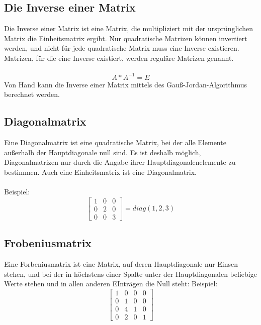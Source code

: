 \documentclass[11pt]{scrreprt}
\begin{document}
\subsection{Die Inverse einer Matrix}
Die Inverse einer Matrix ist eine Matrix, die multipliziert mit der ursprünglichen Matrix die Einheitsmatrix ergibt. Nur quadratische Matrizen können invertiert werden, und nicht für jede quadratische Matrix muss eine Inverse existieren. Matrizen, für die eine Inverse existiert, werden reguläre Matrizen genannt.\\
\\
\begin{equation}
A * A^{-1} = E
\end{equation}
Von Hand kann die Inverse einer Matrix mittels des Gauß-Jordan-Algorithmus berechnet werden.
\subsection{Diagonalmatrix}
Eine Diagonalmatrix ist eine quadratische Matrix, bei der alle Elemente außerhalb der Hauptdiagonale null sind. Es ist deshalb möglich, Diagonalmatrizen nur durch die Angabe ihrer Hauptdiagonalenelemente zu bestimmen. Auch eine Einheitsmatrix ist eine Diagonalmatrix.\\
\\
Beispiel:
\begin{equation}
\begin{bmatrix}
1 & 0 & 0 \\
0 & 2 & 0 \\
0 & 0 & 3 
\end {bmatrix}
= diag(1,2,3)
\end{equation}

\subsection{Frobeniusmatrix}
Eine Forbeniusmatrix ist eine Matrix, auf deren Hauptdiagonale nur Einsen stehen, und bei der in höchstens einer Spalte unter der Hauptdiagonalen beliebige Werte stehen und in allen anderen EInträgen die Null steht: Beispiel:
\begin{equation}
\begin{bmatrix}
1 & 0 & 0 & 0 \\
0 & 1 & 0 & 0 \\
0 & 4 & 1 & 0 \\
0 & 2 & 0 & 1
\end {bmatrix}
\end{equation}
\end{document}
